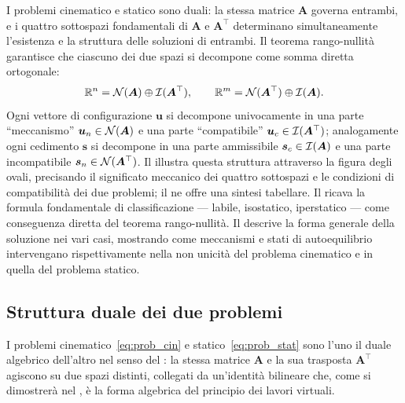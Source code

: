 I problemi cinematico e statico sono duali: la stessa matrice $\bm{A}$
governa entrambi, e i quattro sottospazi fondamentali di $\bm{A}$ e
$\bm{A}^\top$ determinano simultaneamente l'esistenza e la struttura
delle soluzioni di entrambi. Il teorema rango-nullità garantisce che
ciascuno dei due spazi si decompone come somma diretta ortogonale:
\begin{equation}
	\mathbb{R}^{n} = \mathcal{N}(\bm{A}) \oplus \mathcal{I}(\bm{A}^{\top}), \qquad
	\mathbb{R}^{m} = \mathcal{N}(\bm{A}^{\top}) \oplus \mathcal{I}(\bm{A}).
\end{equation}
Ogni vettore di configurazione $\bm{u}$ si decompone univocamente in
una parte ``meccanismo'' $\bm{u}_n \in \mathcal{N}(\bm{A})$ e una parte
``compatibile'' $\bm{u}_c \in \mathcal{I}(\bm{A}^\top)$; analogamente ogni
cedimento $\bm{s}$ si decompone in una parte ammissibile
$\bm{s}_c \in \mathcal{I}(\bm{A})$ e una parte incompatibile
$\bm{s}_n \in \mathcal{N}(\bm{A}^\top)$.
Il  illustra questa struttura attraverso
la figura degli ovali, precisando il significato meccanico dei quattro
sottospazi e le condizioni di compatibilità dei due problemi; il
 ne offre una sintesi tabellare. Il
 ricava la formula fondamentale di
classificazione --- labile, isostatico, iperstatico --- come
conseguenza diretta del teorema rango-nullità. Il
 descrive la forma generale della
soluzione nei vari casi, mostrando come meccanismi e stati di
autoequilibrio intervengano rispettivamente nella non unicità del
problema cinematico e in quella del problema statico.




\subsection{Struttura duale dei due problemi}\label{sec:dualita_cin_stat}

I problemi cinematico~\eqref{eq:prob_cin} e statico~\eqref{eq:prob_stat} sono
l'uno il duale algebrico dell'altro nel senso del
: la stessa matrice $\bm{A}$ e la sua
trasposta $\bm{A}^\top$ agiscono su due spazi distinti, collegati da
un'identità bilineare che, come si dimostrerà nel , è la
forma algebrica del principio dei lavori virtuali.



